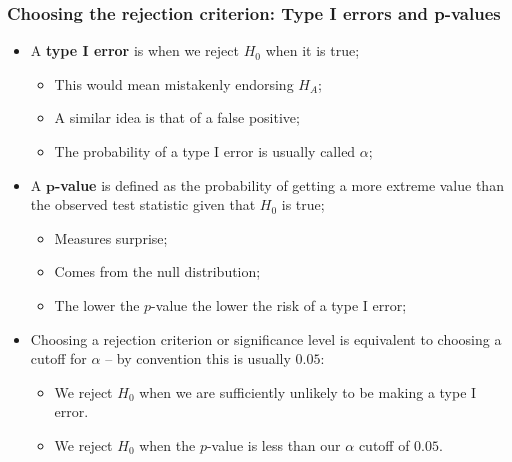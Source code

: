 \documentclass[aspectratio=169]{beamer}
\theoremstyle{principle}
\begin{document}
\begin{frame}
\frametitle{Choosing the rejection criterion: Type I errors and p-values}

\begin{itemize}
\item A \textbf{type I error} is when we reject $H_0$ when it is true;
\begin{itemize}
\item This would mean mistakenly endorsing $H_A$;
\item A similar idea is that of a false positive;
\item The probability of a type I error is usually called $\alpha$;
\end{itemize}
\bigskip
\bigskip

\item A $\mathbf{p}$\textbf{-value} is defined as the probability of getting a more extreme value than the observed test statistic given that $H_0$ is true;
\begin{itemize}
\item Measures surprise;
\item Comes from the null distribution;
\item The lower the $p$-value the lower the risk of a type I error;
\end{itemize}
\bigskip
\bigskip

\item Choosing a rejection criterion or significance level is equivalent to choosing a cutoff for $\alpha$ -- by convention this is usually $0.05$:
\begin{itemize}
\item We reject $H_0$ when we are sufficiently unlikely to be making a type I error.
\item We reject $H_0$ when the $p$-value is less than our $\alpha$ cutoff of $0.05$.
\end{itemize}
\end{itemize}

\end{frame}
\end{document}
